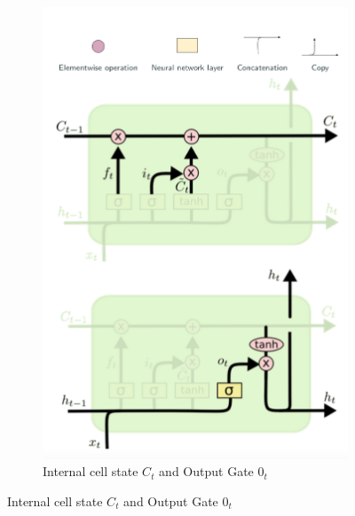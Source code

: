 \begin{figure}[H]
\begin{subfigure}[b]{0.4\textwidth}
        \includegraphics[width=\linewidth]{img/LSTM_unit_learn.png}
        \caption{Internal cell state $C_t$ and Output Gate $0_t$}
    \end{subfigure}
\end{figure}


